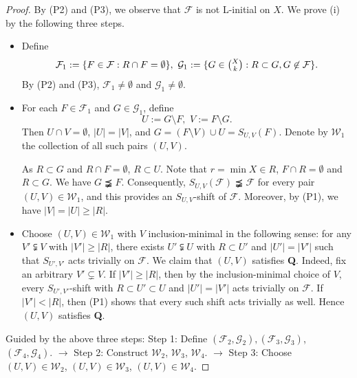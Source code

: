 \documentclass[11pt]{article}
\def\marrow{{\boldmath {\marginpar[\hfill$\rightarrow \rightarrow$]{$\leftarrow \leftarrow$}}}}
\def\andrey#1{{\sc Andrey: }{\marrow\sf \textcolor{blue}{#1}}}
\newcommand{\m}{\mathcal}
\begin{document}
\begin{proof}
By (P2) and (P3), 
we observe that $\m F$ is not L-initial on $X$. 
We prove (i) by the following three steps.
\begin{itemize}
\item[Step 1.] 
Define
\[
\m F_1:=\{F\in \m F: R\cap F =\emptyset\}, \,\, \m G_1:=\{G\in \tbinom{X}{k}: R\subset G, G\not\in \m F\}.
\]
By (P2) and (P3), $\m F_1\ne \emptyset$ and $\m G_1\ne \emptyset$.

\item[Step 2.] For each $F\in\mathcal F_1$ and $G\in\mathcal G_1$, define
\[
U:=G\setminus F, \,\, V:=F\setminus G.
\]
Then $U\cap V=\emptyset$, $|U|=|V|$, and
$
G=(F\setminus V)\cup U=S_{U,V}(F).
$
Denote by $\m W_1$ the collection of all such pairs $(U,V)$.

As $R\subset G$ and $R\cap F=\emptyset$, $R\subset U$. 
Note that $r=\min X\in R$, $F\cap R=\emptyset$ and $R\subset G$.
We have $G\precneqq F$. 
Consequently, $S_{U,V}(\m F)\precneqq \m F$ for every pair $(U,V)\in \m W_1$, and this provides an $S_{U,V}$-shift of $\m F$. Moreover, by (P1), we have $|V|=|U|\ge |R|$. 

\item[Step 3.] 
Choose $(U,V)\in \m W_1$ with $V$ inclusion-minimal in the following sense: for any $V'\subsetneqq V$ with $|V'|\ge |R|$, there exists $U'\subsetneqq U$ with  $R\subset U'$ and $|U'|=|V'|$ such that $S_{U',V'}$ acts trivially on $\m F$. 
We claim that $(U,V)$ satisfies {\bf Q}. 
Indeed, fix an arbitrary $V'\subsetneq V$. 
If $|V'|\ge |R|$, then by the inclusion-minimal choice of $V$,
every $S_{U',V'}$-shift with
$R\subset U'\subset U$ and $|U'|=|V'|$
acts trivially on $\mathcal F$.
If $|V'|<|R|$, then (P1) shows that every such shift acts trivially as well. 
Hence $(U,V)$ satisfies {\bf Q}.
\end{itemize}

Guided by the above three steps:
Step 1: Define $(\m F_2, \m G_2), (\m F_3, \m G_3)$, $(\m F_4, \m G_4)$.
$\longrightarrow$
Step 2: Construct $\m W_2$, $\m W_3$, $\m W_4$.
$\longrightarrow$
Step 3: Choose $(U,V)\in \m W_2$, $(U,V)\in \m W_3$, $(U,V)\in \m W_4$.


\end{proof}
\end{document}
